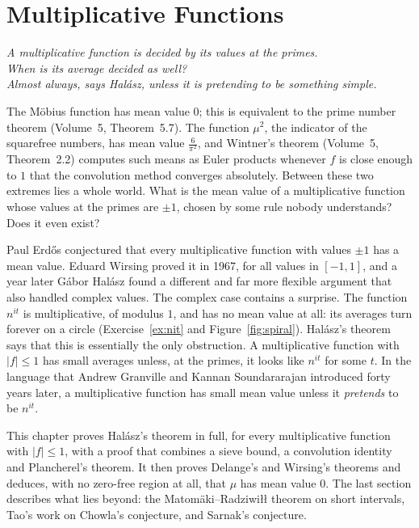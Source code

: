\chapter{Multiplicative Functions}
\begin{center}\itshape
A multiplicative function is decided by its values at the primes.\\
When is its average decided as well?\\
Almost always, says Halász, unless it is pretending to be something simple.
\end{center}

The Möbius function has mean value $0$; this is equivalent to the prime number theorem (Volume~5, Theorem~5.7). The function $\mu^2$, the indicator of the squarefree numbers, has mean value $\frac6{\pi^2}$, and Wintner's theorem (Volume~5, Theorem~2.2) computes such means as Euler products whenever $f$ is close enough to $1$ that the convolution method converges absolutely. Between these two extremes lies a whole world. What is the mean value of a multiplicative function whose values at the primes are $\pm1$, chosen by some rule nobody understands? Does it even exist?

Paul Erdős conjectured that every multiplicative function with values $\pm1$ has a mean value. Eduard Wirsing proved it in 1967, for all values in $[-1,1]$, and a year later Gábor Halász found a different and far more flexible argument that also handled complex values. The complex case contains a surprise. The function $n^{it}$ is multiplicative, of modulus $1$, and has no mean value at all: its averages turn forever on a circle (Exercise~\ref{ex:nit} and Figure~\ref{fig:spiral}). Halász's theorem says that this is essentially the only obstruction. A multiplicative function with $|f|\le1$ has small averages unless, at the primes, it looks like $n^{it}$ for some $t$. In the language that Andrew Granville and Kannan Soundararajan introduced forty years later, a multiplicative function has small mean value unless it \emph{pretends} to be $n^{it}$.

This chapter proves Halász's theorem in full, for every multiplicative function with $|f|\le1$, with a proof that combines a sieve bound, a convolution identity and Plancherel's theorem. It then proves Delange's and Wirsing's theorems and deduces, with no zero-free region at all, that $\mu$ has mean value $0$. The last section describes what lies beyond: the Matomäki--Radziwiłł theorem on short intervals, Tao's work on Chowla's conjecture, and Sarnak's conjecture.

